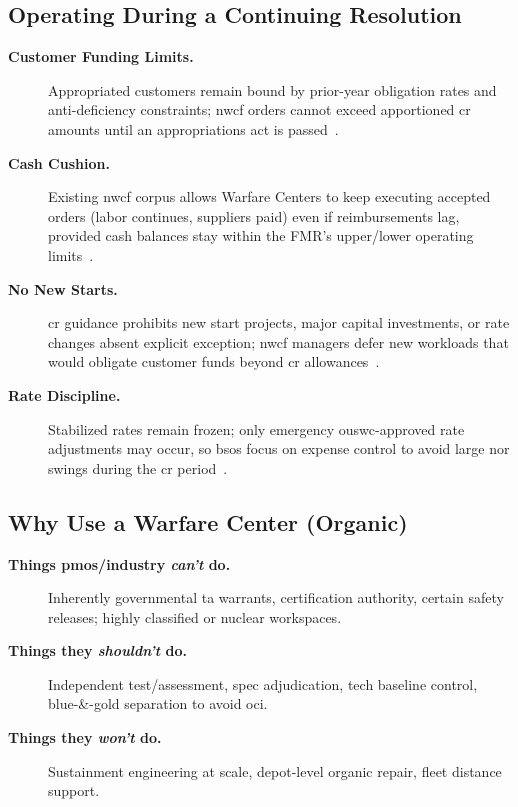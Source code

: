 \documentclass[../main.tex]{subfiles}
\begin{document}
\subsection{Operating During a Continuing Resolution}
\begin{description}
	\item[\textbf{Customer Funding Limits.}] Appropriated customers remain bound by prior-year obligation rates and anti-deficiency constraints; \ac{nwcf} orders cannot exceed apportioned \ac{cr} amounts until an appropriations act is passed~\autocite{CRS-CR}.
	\item[\textbf{Cash Cushion.}] Existing \ac{nwcf} corpus allows Warfare Centers to keep executing accepted orders (labor continues, suppliers paid) even if reimbursements lag, provided cash balances stay within the FMR's upper/lower operating limits~\autocite{DoDFMR-Vol3-Ch19}.
	\item[\textbf{No New Starts.}] \ac{cr} guidance prohibits new start projects, major capital investments, or rate changes absent explicit exception; \ac{nwcf} managers defer new workloads that would obligate customer funds beyond \ac{cr} allowances~\autocite{CRS-CR}.
	\item[\textbf{Rate Discipline.}] Stabilized rates remain frozen; only emergency \ac{ouswc}-approved rate adjustments may occur, so \acp{bso} focus on expense control to avoid large \ac{nor} swings during the \ac{cr} period~\autocite{DoDFMR-Vol3-Ch19}.
\end{description}

\subsection{Why Use a Warfare Center (Organic)}
\begin{description}
	\item[\textbf{Things \acp{pmo}/industry \emph{can't} do.}] Inherently governmental \ac{ta} warrants, certification authority, certain safety releases; highly classified or nuclear workspaces.
	\item[\textbf{Things they \emph{shouldn't} do.}] Independent test/assessment, spec adjudication, tech baseline control, blue-\&-gold separation to avoid \ac{oci}.
	\item[\textbf{Things they \emph{won't} do.}] Sustainment engineering at scale, depot-level organic repair, fleet distance support.
\end{description}
\end{document}
